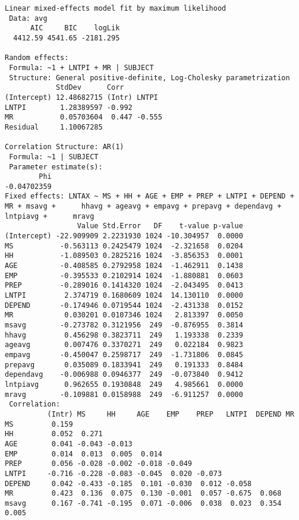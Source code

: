 \documentclass[]{book}
\begin{document}
\begin{verbatim}
Linear mixed-effects model fit by maximum likelihood
 Data: avg 
      AIC     BIC    logLik
  4412.59 4541.65 -2181.295

Random effects:
 Formula: ~1 + LNTPI + MR | SUBJECT
 Structure: General positive-definite, Log-Cholesky parametrization
            StdDev      Corr         
(Intercept) 12.48682715 (Intr) LNTPI 
LNTPI        1.28389597 -0.992       
MR           0.05703604  0.447 -0.555
Residual     1.10067285              

Correlation Structure: AR(1)
 Formula: ~1 | SUBJECT 
 Parameter estimate(s):
        Phi 
-0.04702359 
Fixed effects: LNTAX ~ MS + HH + AGE + EMP + PREP + LNTPI + DEPEND + MR + msavg +      hhavg + ageavg + empavg + prepavg + dependavg + lntpiavg +      mravg 
                 Value Std.Error   DF    t-value p-value
(Intercept) -22.909909 2.2231930 1024 -10.304957  0.0000
MS           -0.563113 0.2425479 1024  -2.321658  0.0204
HH           -1.089503 0.2825216 1024  -3.856353  0.0001
AGE          -0.408585 0.2792958 1024  -1.462911  0.1438
EMP          -0.395533 0.2102914 1024  -1.880881  0.0603
PREP         -0.289016 0.1414320 1024  -2.043495  0.0413
LNTPI         2.374719 0.1680609 1024  14.130110  0.0000
DEPEND       -0.174946 0.0719544 1024  -2.431338  0.0152
MR            0.030201 0.0107346 1024   2.813397  0.0050
msavg        -0.273782 0.3121956  249  -0.876955  0.3814
hhavg         0.456298 0.3823711  249   1.193338  0.2339
ageavg        0.007476 0.3370271  249   0.022184  0.9823
empavg       -0.450047 0.2598717  249  -1.731806  0.0845
prepavg       0.035089 0.1833941  249   0.191333  0.8484
dependavg    -0.006988 0.0946377  249  -0.073840  0.9412
lntpiavg      0.962655 0.1930848  249   4.985661  0.0000
mravg        -0.109881 0.0158988  249  -6.911257  0.0000
 Correlation: 
          (Intr) MS     HH     AGE    EMP    PREP   LNTPI  DEPEND MR    
MS         0.159                                                        
HH         0.052  0.271                                                 
AGE        0.041 -0.043 -0.013                                          
EMP        0.014  0.013  0.005  0.014                                   
PREP       0.056 -0.028 -0.002 -0.018 -0.049                            
LNTPI     -0.716 -0.228 -0.083 -0.045  0.020 -0.073                     
DEPEND     0.042 -0.433 -0.185  0.101 -0.030  0.012 -0.058              
MR         0.423  0.136  0.075  0.130 -0.001  0.057 -0.675  0.068       
msavg      0.167 -0.741 -0.195  0.071 -0.006  0.038  0.023  0.354  0.005

\end{verbatim}
\end{document}
